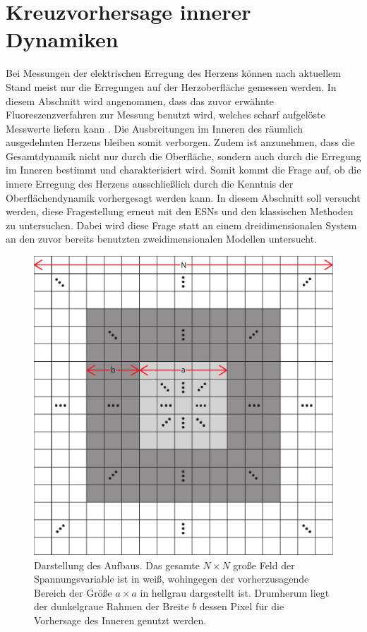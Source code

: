 \clearpage
\section{Kreuzvorhersage innerer Dynamiken}
\label{sec:exp_inner_prediction}
Bei Messungen der elektrischen Erregung des Herzens können nach aktuellem Stand meist nur die Erregungen auf der Herzoberfläche gemessen werden. In diesem Abschnitt wird angenommen, dass das zuvor erwähnte Fluoreszenzverfahren zur Messung benutzt wird, welches scharf aufgelöste Messwerte liefern kann \citep{grynkiewicz1985new}. Die Ausbreitungen im Inneren des räumlich ausgedehnten Herzens bleiben somit verborgen. Zudem ist anzunehmen, dass die Gesamtdynamik nicht nur durch die Oberfläche, sondern auch durch die Erregung im Inneren bestimmt und charakterisiert wird. Somit kommt die Frage auf, ob die innere Erregung des Herzens ausschließlich durch die Kenntnis der Oberflächendynamik vorhergesagt werden kann. In diesem Abschnitt soll versucht werden, diese Fragestellung erneut mit den \textsc{ESN}s und den klassischen Methoden zu untersuchen. Dabei wird diese Frage statt an einem dreidimensionalen System an den zuvor bereits benutzten zweidimensionalen Modellen untersucht.\\

\begin{figure}[h]
	\centering
	\includegraphics[width=.6\linewidth]{figures/illustrations/inner_prediction.pdf}
	\caption{Darstellung des Aufbaus. Das gesamte $N \times N$ große Feld der Spannungsvariable ist in weiß, wohingegen der vorherzusagende Bereich der Größe $a \times a$ in hellgrau dargestellt ist. Drumherum liegt der dunkelgraue Rahmen der Breite $b$ dessen Pixel für die Vorhersage des Inneren genutzt werden.}
	\label{fig:exp_inner_prediction}
\end{figure}

